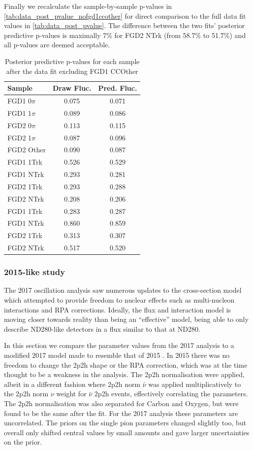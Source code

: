 Finally we recalculate the sample-by-sample p-values in \autoref{tab:data_post_pvalue_nofgd1ccother} for direct comparison to the full data fit values in \autoref{tab:data_post_pvalue}. The difference between the two fits' posterior predictive p-values is maximally 7\% for FGD2 NTrk (from 58.7\% to 51.7\%) and all p-values are deemed acceptable.
\begin{table}[h]
	\centering
	\begin{tabular}{l | c c }
		\hline \hline
		Sample & Draw Fluc. & Pred. Fluc. \\
		\hline
		FGD1 0$\pi$ & 0.075 & 0.071 \\
		FGD1 1$\pi$ & 0.089 & 0.086 \\
		FGD2 0$\pi$ & 0.113 & 0.115 \\
		FGD2 1$\pi$ & 0.087 & 0.096 \\
		FGD2 Other  & 0.090 & 0.087 \\
		\hline
		FGD1 1Trk & 0.526 & 0.529 \\
		FGD1 NTrk & 0.293 & 0.281 \\
		FGD2 1Trk & 0.293 & 0.288 \\
		FGD2 NTrk & 0.208 & 0.206 \\
		\hline
		FGD1 \numu 1Trk & 0.283 & 0.287 \\
		FGD1 \numu NTrk & 0.860 & 0.859 \\
		FGD2 \numu 1Trk & 0.313 & 0.307 \\
		FGD2 \numu NTrk & 0.517 & 0.520 \\
		\hline
		\hline
	\end{tabular}
	\caption{Posterior predictive p-values for each sample after the data fit excluding FGD1 CCOther}
	\label{tab:data_post_pvalue_nofgd1ccother}
\end{table}

\subsubsection{2015-like study}
The 2017 oscillation analysis saw numerous updates to the cross-section model which attempted to provide freedom to nuclear effects such as multi-nucleon interactions and RPA corrections. Ideally, the flux and interaction model is moving closer towards reality than being an ``effective'' model, being able to only describe ND280-like detectors in a flux similar to that at ND280. 

In this section we compare the parameter values from the 2017 analysis to a modified 2017 model made to resemble that of 2015 \cite{t2k_2015}. In 2015 there was no freedom to change the 2p2h shape or the RPA correction, which was at the time thought to be a weakness in the analysis. The 2p2h normalisation were applied, albeit in a different fashion where 2p2h norm $\bar{\nu}$ was applied multiplicatively to the 2p2h norm $\nu$ weight for $\bar{\nu}$ 2p2h events, effectively correlating the parameters. The 2p2h normalisation was also separated for Carbon and Oxygen, but were found to be the same after the fit. For the 2017 analysis these parameters are uncorrelated. The priors on the single pion parameters changed slightly too, but overall only shifted central values by small amounts and gave larger uncertainties on the prior.


